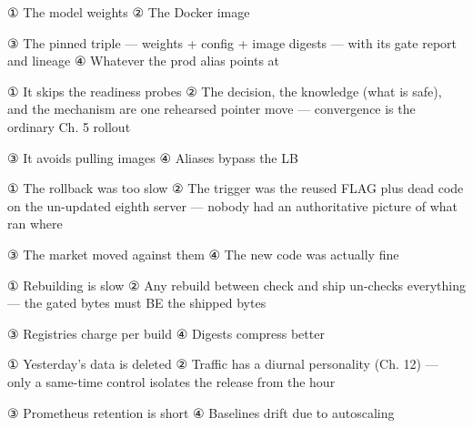 
\begin{tbboptions}
  \item ① The model weights        ② The Docker image
  \item ③ The pinned triple — weights + config + image digests — with its gate report and lineage        ④ Whatever the prod alias points at
\end{tbboptions}


\begin{tbboptions}
  \item ① It skips the readiness probes        ② The decision, the knowledge (what is safe), and the mechanism are one rehearsed pointer move — convergence is the ordinary Ch. 5 rollout
  \item ③ It avoids pulling images        ④ Aliases bypass the LB
\end{tbboptions}


\begin{tbboptions}
  \item ① The rollback was too slow        ② The trigger was the reused FLAG plus dead code on the un-updated eighth server — nobody had an authoritative picture of what ran where
  \item ③ The market moved against them        ④ The new code was actually fine
\end{tbboptions}


\begin{tbboptions}
  \item ① Rebuilding is slow        ② Any rebuild between check and ship un-checks everything — the gated bytes must BE the shipped bytes
  \item ③ Registries charge per build        ④ Digests compress better
\end{tbboptions}


\begin{tbboptions}
  \item ① Yesterday's data is deleted        ② Traffic has a diurnal personality (Ch. 12) — only a same-time control isolates the release from the hour
  \item ③ Prometheus retention is short        ④ Baselines drift due to autoscaling
\end{tbboptions}

